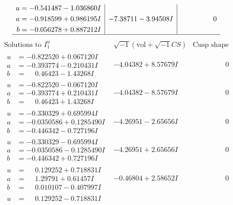 \documentclass[1p]{elsarticle_modified}
\theoremstyle{definition}
\newcommand{\I}{\sqrt{-1}}
\begin{document}
$$\begin{array}{c|c|c}
\begin{aligned}
u &= -0.541487 - 1.036860 I \\
a &= -0.918599 + 0.986195 I \\
b &= -0.056278 + 0.887212 I\end{aligned}
 & -7.38711 - 3.94508 I & \phantom{-0.000000 } 0\\
 \hline 
 \end{array}$$\newpage$$\begin{array}{c|c|c}  
\text{Solutions to }I^u_{1}& \I (\text{vol} + \sqrt{-1}CS) & \text{Cusp shape}\\
 \hline 
\begin{aligned}
u &= -0.822520 + 0.067120 I \\
a &= -0.393774 - 0.210431 I \\
b &= \phantom{-}0.46423 - 1.43268 I\end{aligned}
 & -4.04382 + 8.57679 I & \phantom{-0.000000 } 0 \\ \hline\begin{aligned}
u &= -0.822520 - 0.067120 I \\
a &= -0.393774 + 0.210431 I \\
b &= \phantom{-}0.46423 + 1.43268 I\end{aligned}
 & -4.04382 - 8.57679 I & \phantom{-0.000000 } 0 \\ \hline\begin{aligned}
u &= -0.330329 + 0.695994 I \\
a &= -0.0350586 + 0.1285490 I \\
b &= -0.446342 - 0.727196 I\end{aligned}
 & -4.26951 - 2.65656 I & \phantom{-0.000000 } 0 \\ \hline\begin{aligned}
u &= -0.330329 - 0.695994 I \\
a &= -0.0350586 - 0.1285490 I \\
b &= -0.446342 + 0.727196 I\end{aligned}
 & -4.26951 + 2.65656 I & \phantom{-0.000000 } 0 \\ \hline\begin{aligned}
u &= \phantom{-}0.129252 + 0.718831 I \\
a &= \phantom{-}1.29791 + 0.61457 I \\
b &= \phantom{-}0.010107 - 0.407997 I\end{aligned}
 & -0.46804 + 2.58652 I & \phantom{-0.000000 } 0 \\ \hline\begin{aligned}
u &= \phantom{-}0.129252 - 0.718831 I \\

\end{aligned}
\end{array}$$
\end{document}
